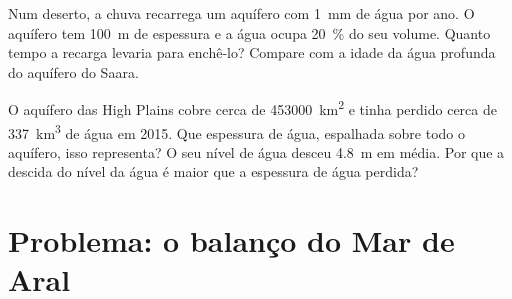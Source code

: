 \begin{exercise}[$\star\star\star$]\label{exo:g10:freshwater-resources:14}
Num deserto, a chuva recarrega um aquífero com \qty{1}{mm} de água por ano.
O aquífero tem \qty{100}{m} de espessura e a água ocupa
\qty{20}{\percent} do seu volume. Quanto tempo a recarga levaria para
enchê-lo? Compare com a idade da água profunda do aquífero do Saara.
\end{exercise}

\begin{exercise}[$\star\star\star$]\label{exo:g10:freshwater-resources:15}
O aquífero das High Plains cobre cerca de \qty{453000}{km^2} e tinha
perdido cerca de \qty{337}{km^3} de água em 2015. Que espessura de água,
espalhada sobre todo o aquífero, isso representa? O seu nível de água desceu
\qty{4.8}{m} em média. Por que a descida do nível da água é maior que a
espessura de água perdida?
\end{exercise}

\section{Problema: o balanço do Mar de Aral}

